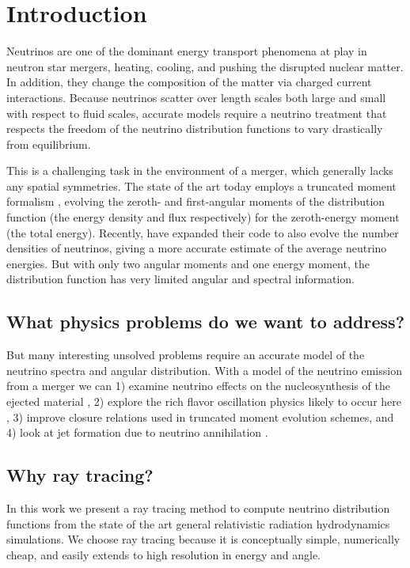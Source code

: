 \documentclass[aps,prd,twocolumn,superscriptaddress,groupedaddress]{revtex4}
\begin{document}
\section{Introduction}
Neutrinos are one of the dominant energy transport phenomena at play in
neutron star mergers, heating, cooling, and pushing the disrupted nuclear
matter.
In addition, they change the composition of the matter via charged current
interactions.
Because neutrinos scatter over length scales both large and small with
respect to fluid scales, accurate models require a neutrino treatment that
respects the freedom of the neutrino distribution functions to vary
drastically from equilibrium.

This is a challenging task in the environment of a merger,
which generally lacks any spatial symmetries.
The state of the art today employs a truncated moment formalism
\citep{fouc2015-m1_bhns, fouc2016-m1_nsns},
evolving the zeroth- and first-angular moments of the distribution function
(the energy density and flux respectively) for the zeroth-energy moment
(the total energy).
Recently, \cite{fouc2016-m1_evolve_n} have expanded their code to also evolve
the number densities of neutrinos, giving a more accurate estimate of the
average neutrino energies.
But with only two angular moments and one energy moment, the distribution
function has very limited angular and spectral information.

\subsection{What physics problems do we want to address?}
But many interesting unsolved problems require an accurate model of the neutrino
spectra and angular distribution.
With a model of the neutrino emission from a merger we can
1) examine neutrino effects on the nucleosynthesis of the ejected material
\citep{robe2016-nsbh_sph_nucleo},
2) explore the rich flavor oscillation physics likely to occur here
\citep{malk2012-mnr_1, malk2014-mnr_2, malk2015-mnr_3, zhu2016-mnr_disk,
  vaan2016-uncovering_mnr},
3) improve closure relations used in truncated moment evolution schemes, and
4) look at jet formation due to neutrino annihilation
\citep{birk2007-nunubar}.

\subsection{Why ray tracing?}
In this work we present a ray tracing method to compute neutrino distribution
functions from the state of the art general relativistic radiation
hydrodynamics simulations.
We choose ray tracing because it is conceptually simple, numerically cheap,
and easily extends to high resolution in energy and angle.
\end{document}
